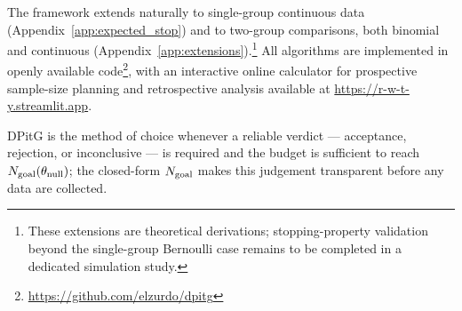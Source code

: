 The framework extends naturally to single-group continuous data
(Appendix~\ref{app:expected_stop}) and to two-group comparisons, both binomial
and continuous (Appendix~\ref{app:extensions}).\footnote{These extensions are
theoretical derivations; stopping-property validation beyond the single-group Bernoulli
case remains to be completed in a dedicated simulation study.}
All algorithms are implemented in openly available
code\footnote{\href{https://github.com/elzurdo/dpitg}{https://github.com/elzurdo/dpitg}},
with an interactive online calculator for prospective sample-size planning and
retrospective analysis available at
\href{https://r-w-t-y.streamlit.app}{https://r-w-t-y.streamlit.app}.

DPitG is the method of choice whenever a reliable verdict --- acceptance, rejection,
or inconclusive --- is required and the budget is sufficient to reach
$N_{\rm goal}(\theta_{\rm null})$; the closed-form $N_{\rm goal}$ makes this judgement
transparent before any data are collected.
